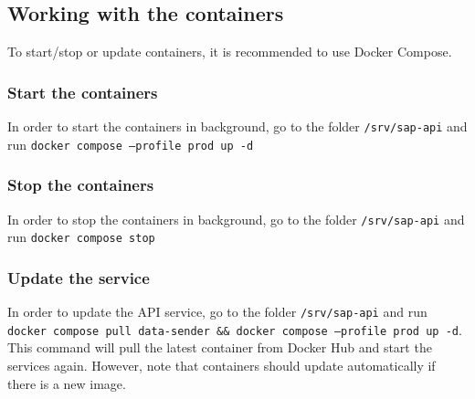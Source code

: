 \subsection{Working with the containers}
To start/stop or update containers, it is recommended to use Docker Compose.
\subsubsection{Start the containers}
In order to start the containers in background, go to the folder \texttt{/srv/sap-api} and run \texttt{docker compose --profile prod up -d}

\subsubsection{Stop the containers}
In order to stop the containers in background, go to the folder \texttt{/srv/sap-api} and run \texttt{docker compose stop}

\subsubsection{Update the service}
In order to update the API service, go to the folder \texttt{/srv/sap-api} and run \texttt{docker compose pull data-sender \&\& docker compose --profile prod up -d}.
This command will pull the latest container from Docker Hub and start the services again.
However, note that containers should update automatically if there is a new image.


